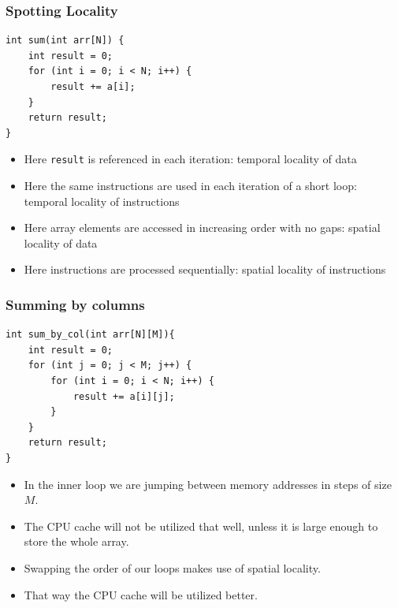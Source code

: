\documentclass[11pt]{beamer}
\begin{document}
\begin{frame}
    \frametitle{Spotting Locality}
    \begin{scriptsize}
        \begin{verbatim}
int sum(int arr[N]) {
    int result = 0;
    for (int i = 0; i < N; i++) {
        result += a[i];
    }
    return result;
}
        \end{verbatim}
    \end{scriptsize}
    \begin{itemize}
        \item<2-> Here \texttt{result} is referenced in each iteration: temporal locality of data
        \item<3-> Here the same instructions are used in each iteration of a short loop: temporal locality of instructions
        \item<4-> Here array elements are accessed in increasing order with no gaps: spatial locality of data
        \item<5-> Here instructions are processed sequentially: spatial locality of instructions
    \end{itemize}
\end{frame}

\begin{frame}
    \frametitle{Summing by columns}
    \begin{scriptsize}
        \begin{verbatim}
int sum_by_col(int arr[N][M]){
    int result = 0;
    for (int j = 0; j < M; j++) {
        for (int i = 0; i < N; i++) {
            result += a[i][j];
        }
    }
    return result;
}
        \end{verbatim}
    \end{scriptsize}
    \begin{itemize}
        \item<2-> In the inner loop we are jumping between memory addresses in steps of size $M$.
        \item<3-> The CPU cache will not be utilized that well, unless it is large enough to store the whole array.
        \item<4-> Swapping the order of our loops makes use of spatial locality.
        \item<5-> That way the CPU cache will be utilized better.
    \end{itemize}
\end{frame}
\end{document}
